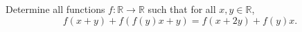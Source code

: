 Determine all functions $f\colon\mathbb{R}\to\mathbb{R}$
such that for all $x,y \in \mathbb{R}$, 
\[
    f(x+y)+f(f(y)x+y)=f(x+2y)+f(y)x.
\]
